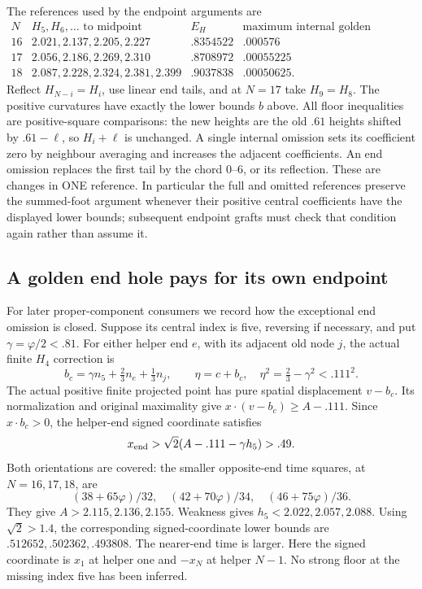 \documentclass[11pt]{article}
\begin{document}
The references used by the endpoint arguments are
\[
\begin{array}{c|c|c|c}
N&H_5,H_6,\ldots\text{ to midpoint}&E_H&
 \text{maximum internal golden omission loss}\\ \hline
16&2.021,2.137,2.205,2.227&.8354522&.000576\\
17&2.056,2.186,2.269,2.310&.8708972&.00055225\\
18&2.087,2.228,2.324,2.381,2.399&.9037838&.00050625 .
\end{array}
\]
Reflect \(H_{N-i}=H_i\), use linear end tails, and at \(N=17\)
take \(H_9=H_8\).
The positive curvatures have exactly the lower bounds \(b\) above.
All floor inequalities are positive-square comparisons:
the new heights are the old \(.61\) heights shifted by
\(.61-\ell\), so \(H_i+\ell\) is unchanged.
A single internal omission sets its coefficient zero by neighbour
averaging and increases the adjacent coefficients.
An end omission replaces the first tail by the chord \(0\)--\(6\),
or its reflection.  These are changes in ONE reference.
In particular the full and omitted references preserve the
summed-foot argument whenever their positive central coefficients
have the displayed lower bounds; subsequent endpoint grafts must
check that condition again rather than assume it.

\subsection{A golden end hole pays for its own endpoint}
\label{app:arithgoldenend}

For later proper-component consumers we record how the exceptional
end omission is closed.  Suppose its central index is five,
reversing if necessary, and put \(\gamma=\varphi/2<.81\).
For either helper end \(e\), with its adjacent old node \(j\),
the actual finite \(H_4\) correction is
\[
 b_c=\gamma n_5+\tfrac23n_e+\tfrac13n_j,\qquad
 \eta=c+b_c,\quad
 \eta^2=\tfrac23-\gamma^2<.111^2 .
\]
The actual positive finite projected point has pure spatial
displacement \(v-b_c\).
Its normalization and original maximality give
\(x\cdot(v-b_c)\ge A-.111\).
Since \(x\cdot b_c>0\), the helper-end signed coordinate satisfies
\[
                  x_{\rm end}>
             \sqrt2(A-.111-\gamma h_5)>.49 .
\]
Both orientations are covered: the smaller opposite-end time
squares, at \(N=16,17,18\), are
\[
 (38+65\varphi)/32,\quad(42+70\varphi)/34,\quad
 (46+75\varphi)/36.
\]
They give \(A>2.115,2.136,2.155\).
Weakness gives \(h_5<2.022,2.057,2.088\).
Using \(\sqrt2>1.4\), the corresponding signed-coordinate lower
bounds are \(.512652,.502362,.493808\).
The nearer-end time is larger.
Here the signed coordinate is \(x_1\) at helper one and
\(-x_N\) at helper \(N-1\).
No strong floor at the missing index five has been inferred.
\end{document}
